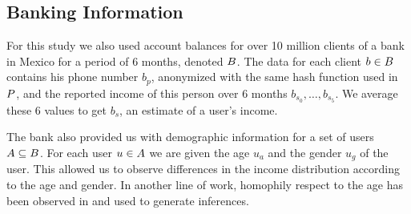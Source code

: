 \subsection{Banking Information}

For this study we also used account balances for over 10 million clients of a bank in Mexico for a period of 6 months, denoted \( \mathlarger{B} \). The data for each client \( b \in \mathlarger{B} \) contains his phone number \( b_p \), anonymized with the same hash function used in \( \mathlarger{P} \), and the reported income of this person over 6 months \( b_{s_0}, \ldots, b_{s_5} \). We average these 6 values to get \( b_s \), an estimate of a user's income.

The bank also provided us with demographic information for a set of users \( \mathlarger{A} \subseteq \mathlarger{B} \). For each user \( u \in \mathlarger{A} \) we are given  the age \( u_a \) and the gender \( u_g \) of the user. This allowed us to observe differences in the income distribution according to the age and gender. In another line of work, homophily respect to the age has been observed in \cite{brea2014} and used to generate inferences.
